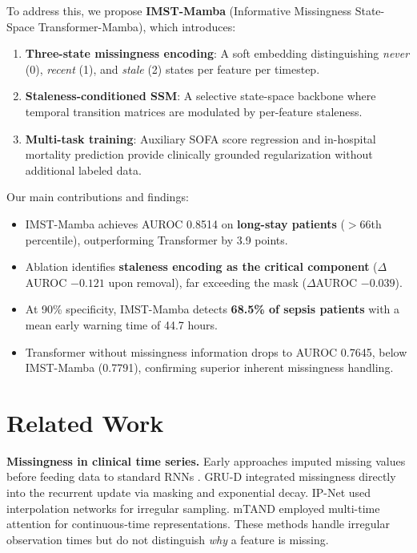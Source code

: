 \documentclass[twoside,11pt]{article}
\begin{document}
To address this, we propose \textbf{IMST-Mamba} (Informative Missingness
State-Space Transformer-Mamba), which introduces:
\begin{enumerate}
  \item \textbf{Three-state missingness encoding}: A soft embedding
        distinguishing \emph{never} (0), \emph{recent} (1), and \emph{stale}
        (2) states per feature per timestep.
  \item \textbf{Staleness-conditioned SSM}: A selective state-space backbone
        where temporal transition matrices are modulated by per-feature
        staleness.
  \item \textbf{Multi-task training}: Auxiliary SOFA score regression and
        in-hospital mortality prediction provide clinically grounded
        regularization without additional labeled data.
\end{enumerate}

Our main contributions and findings:
\begin{itemize}
  \item IMST-Mamba achieves AUROC 0.8514 on \textbf{long-stay patients}
        ($>$66th percentile), outperforming Transformer by 3.9 points.
  \item Ablation identifies \textbf{staleness encoding as the critical
        component} ($\Delta$AUROC $-0.121$ upon removal), far exceeding the
        mask ($\Delta$AUROC $-0.039$).
  \item At 90\% specificity, IMST-Mamba detects \textbf{68.5\% of sepsis
        patients} with a mean early warning time of 44.7 hours.
  \item Transformer without missingness information drops to AUROC 0.7645,
        below IMST-Mamba (0.7791), confirming superior inherent missingness
        handling.
\end{itemize}

\section{Related Work}
\label{sec:related}

\textbf{Missingness in clinical time series.}
Early approaches imputed missing values before feeding data to standard
RNNs \citep{lipton2016directly}.  GRU-D \citep{che2018gruD} integrated
missingness directly into the recurrent update via masking and exponential
decay.  IP-Net \citep{shukla2019ipnet} used interpolation networks for
irregular sampling.  mTAND \citep{shukla2021mtand} employed multi-time
attention for continuous-time representations.  These methods handle irregular
observation times but do not distinguish \emph{why} a feature is missing.
\end{document}
